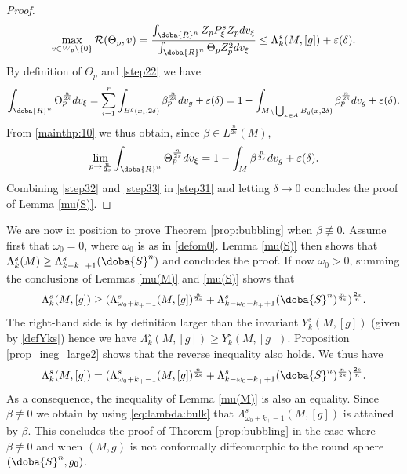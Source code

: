 \documentclass[10pt]{amsart}
\numberwithin{equation}{section}
\def\La{{\Lambda}}
\def\be{{\beta}}
\def\de{{\delta}}
\gdef\mR{\doba{R}}
\gdef\mS{\doba{S}}
\newcommand{\ve}{\varepsilon}
\theoremstyle{plain}
\theoremstyle{remark}
\begin{document}
\begin{proof}
\begin{equation} \label{step32}
\max_{v \in W_p \backslash \{0\}} \mathcal{R}(\Theta_p,v) = \frac{\int_{\mR^n} Z_p P_\xi^s Z_p dv_\xi}{\int_{\mR^n} \Theta_p Z_p^2 dv_\xi}  \leq \La_k^s(M,[g] )+ \ve(\delta).
\end{equation}
By definition of $\Theta_p$ and \eqref{step22} we have 
$$ \int_{\mR^n} \Theta_p^{\frac{n}{2s}}  dv_\xi = \sum_{i=1}^r \int_{B^g(x_i,2\de)} \be_p^{\frac{n}{2s}} dv_g+ \ve(\delta) = 1 - \int_{M \backslash \bigcup_{x \in A} B_g(x, 2 \delta)} \be_p^{\frac{n}{2s}} dv_g  + \ve(\delta). $$ 
From \eqref{mainthp:10} we thus obtain, since $\beta \in L^{\frac{n}{2s}}(M)$, 
\begin{equation} \label{step33}
\lim_{p \to \frac{n}{2s}}\int_{\mR^n} \Theta_p^{\frac{n}{2s}}  dv_\xi  = 1- \int_{M}\be^{\frac{n}{2s}} dv_g + \ve(\delta).
\end{equation}
Combining \eqref{step32} and \eqref{step33} in \eqref{step31} and letting $\delta \to 0$ concludes the proof of Lemma \ref{mu(S)}.
\end{proof} 


 
We are now in position to prove Theorem \ref{prop:bubbling} when $\beta \not \equiv 0$. Assume first that $\omega_0=0$, where $\omega_0$ is as in \eqref{defom0}. %
Lemma \ref{mu(S)} then shows that $   \La_k^s(M)\geq \Lambda_{k-k_+ +1}^s(\mS^n)$ and concludes the proof. If now $\omega_0 >0$, summing the conclusions of Lemmas  \ref{mu(M)} and \ref{mu(S)} shows that 
$$\La_k^s(M,[g])\geq (\La_{\omega_0 + k_+-1}^s(M,[g])^{\frac{n}{2s}}  + \La_{k-\omega_0-k_+ +1}^s(\mS^n)^{\frac{n}{2s}})^{\frac{2s}{n}}. $$ %
The right-hand side is by definition larger than the invariant $Y_k^s(M,[g])$ (given by \eqref{defYks}) hence we have $\Lambda_k^s(M,[g]) \ge Y_k^s(M,[g])$. Proposition \ref{prop_ineg_large2} shows that the reverse inequality also holds. We thus have 
$$\La_k^s(M,[g])=  (\La_{\omega_0 + k_+-1}^s  (M,[g])^{\frac{n}{2s}}  + \La_{k-\omega_0-k_+ +1}^s(\mS^n)^{\frac{n}{2s}})^{\frac{2s}{n}}. $$ %
As a consequence, the inequality of Lemma \ref{mu(M)} is also an equality. Since $\beta \not \equiv 0$ we obtain by using \eqref{eq:lambda:bulk} that $\La_{\omega_0+ k_+ -1}^s (M,[g])$ is attained by $\be$. This concludes the proof of Theorem \ref{prop:bubbling} in the case where $\beta \not \equiv 0$ and when $(M,g)$ is not conformally diffeomorphic to the round sphere $(\mS^n, g_0)$. 
\end{document}
